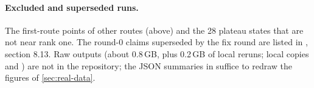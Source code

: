 \paragraph{Excluded and superseded runs.}
The first-route points of other routes (above) and the 28 plateau states that are not near rank one. The
round-0 claims superseded by the fix round are listed in , section 8.13. Raw outputs
(about 0.8\,GB, plus 0.2\,GB of local reruns; local
copies  and ) are not in the repository; the JSON
summaries in  suffice to redraw the figures of \cref{sec:real-data}.
